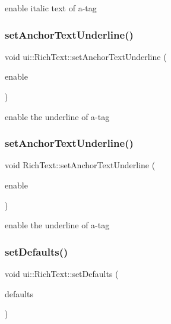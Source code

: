 enable italic text of a-\/tag \mbox{\label{classui_1_1RichText_a5a435489915c1e0d98fb4f53382ec6e0}} 
\subsubsection{\texorpdfstring{set\+Anchor\+Text\+Underline()}{setAnchorTextUnderline()}\hspace{0.1cm}{\footnotesize\ttfamily [1/2]}}
{\footnotesize\ttfamily void ui\+::\+Rich\+Text\+::set\+Anchor\+Text\+Underline (\begin{DoxyParamCaption}\item[{bool}]{enable }\end{DoxyParamCaption})}

enable the underline of a-\/tag \mbox{\label{classui_1_1RichText_a8e545c2ecb49337c34873e6335277714}} 
\subsubsection{\texorpdfstring{set\+Anchor\+Text\+Underline()}{setAnchorTextUnderline()}\hspace{0.1cm}{\footnotesize\ttfamily [2/2]}}
{\footnotesize\ttfamily void Rich\+Text\+::set\+Anchor\+Text\+Underline (\begin{DoxyParamCaption}\item[{bool}]{enable }\end{DoxyParamCaption})}

enable the underline of a-\/tag \mbox{\label{classui_1_1RichText_a81b7598f89c8fa589afb315ff74f5aa3}} 
\subsubsection{\texorpdfstring{set\+Defaults()}{setDefaults()}\hspace{0.1cm}{\footnotesize\ttfamily [1/2]}}
{\footnotesize\ttfamily void ui\+::\+Rich\+Text\+::set\+Defaults (\begin{DoxyParamCaption}\item[{const Value\+Map \&}]{defaults }\end{DoxyParamCaption})}

